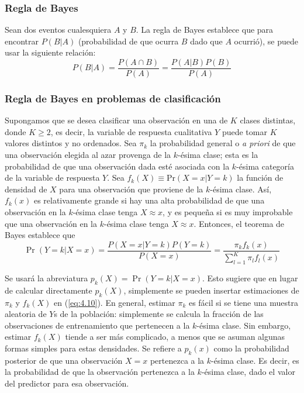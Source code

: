 \subsubsection{Regla de Bayes}

Sean dos eventos cualesquiera $A$ y $B$. La regla de Bayes establece que para encontrar $P(B | A)$ (probabilidad de que ocurra $B$ dado que $A$ ocurrió), se puede usar la siguiente relación:
\begin{equation}
P(B | A) = \frac{P (A \cap B)}{P(A)} = \frac{P(A | B)P(B)}{P(A)} 
\label{eq:4.8}
\end{equation}

\subsubsection{Regla de Bayes en problemas de clasificación}

Supongamos que se desea clasificar una observación en una de $K$ clases distintas, donde $K \geq 2$, es decir, la variable de respuesta cualitativa $Y$ puede tomar $K$ valores distintos y no ordenados. Sea $\pi_k$ la probabilidad general o \textit{a priori} de que una observación elegida al azar provenga de la $k$-ésima clase; esta es la probabilidad de que una observación dada esté asociada con la $k$-ésima categoría de la variable de respuesta $Y$. Sea $f_k(X) \equiv \text{Pr}(X = x | Y = k)$ la función de densidad de $X$ para una observación que proviene de la $k$-ésima clase. Así, $f_k(x)$ es relativamente grande si hay una alta probabilidad de que una observación en la $k$-ésima clase tenga $X \approx x$, y es pequeña si es muy improbable que una observación en la $k$-ésima clase tenga $X \approx x$. Entonces, el teorema de Bayes establece que
\begin{equation}
\Pr(Y = k | X = x) = \frac{P(X = x | Y = k) P (Y = k)}{P(X = x)} = \frac{\pi_k f_k(x)}{\sum_{l=1}^K \pi_l f_l(x)}
\label{eq:4.10}
\end{equation}

Se usará la abreviatura $p_k(X) = \Pr(Y = k | X = x)$. Esto sugiere que en lugar de calcular directamente $p_k(X)$, simplemente se pueden insertar estimaciones de $\pi_k$ y $f_k(X)$ en (\ref{eq:4.10}). En general, estimar $\pi_k$ es fácil si se tiene una muestra aleatoria de $Y$s de la población: simplemente se calcula la fracción de las observaciones de entrenamiento que pertenecen a la $k$-ésima clase. Sin embargo, estimar $f_k(X)$ tiende a ser más complicado, a menos que se asuman algunas formas simples para estas densidades. Se refiere a $p_k(x)$ como la probabilidad posterior de que una observación $X = x$ pertenezca a la $k$-ésima clase. Es decir, es la probabilidad de que la observación pertenezca a la $k$-ésima clase, dado el valor del predictor para esa observación. \\

